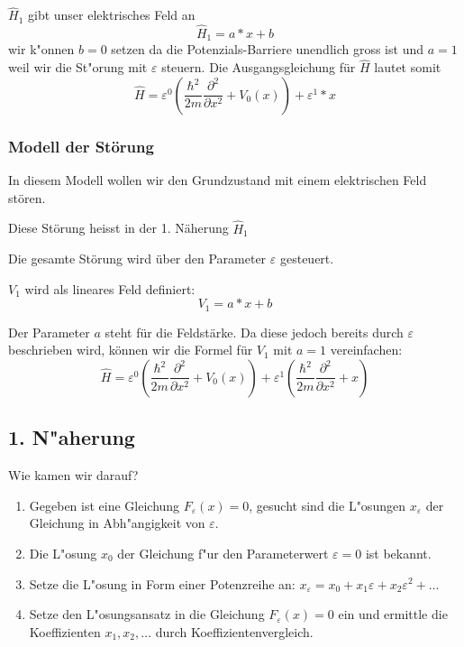 \begin{refsection}
$\hat H_1$ gibt unser elektrisches Feld an
\[
  \hat H_1 = a*x + b
\]
wir k"onnen $b = 0$ setzen da die Potenzials-Barriere unendlich gross ist und $a = 1$ weil wir die St"orung mit $\varepsilon$ steuern.
Die Ausgangsgleichung f\"ur $\hat{H}$ lautet somit
\[
  \hat{H} = \varepsilon^0 ( \frac{\hbar^2}{2m} \frac{\partial^2}{\partial x^2} + V_0(x) )
            + \varepsilon^1*x
\]

\subsubsection{ Modell der St\"orung }
In diesem Modell wollen wir den Grundzustand mit einem elektrischen Feld st\"oren.

Diese St\"orung heisst in der 1. N\"aherung $\hat H_1$

Die gesamte St\"orung wird \"uber den Parameter $\varepsilon$ gesteuert.

$V_1$ wird als lineares Feld definiert:
\[
  V_1 = a*x + b
\]

Der Parameter $a$ steht f\"ur die Feldst\"arke. Da diese jedoch bereits durch 
$\varepsilon$ beschrieben wird, k\"onnen wir die Formel f\"ur $V_1$ mit $a = 1$ vereinfachen:
\[
  \hat{H} = \varepsilon^0 ( \frac{\hbar^2}{2m} \frac{\partial^2}{\partial x^2} + V_0(x) )
            + \varepsilon^1 ( \frac{\hbar^2}{2m} \frac{\partial^2}{\partial x^2} + x )
\]


\subsection{ 1. N"aherung }

Wie kamen wir darauf?

\begin{enumerate}
\item Gegeben ist eine Gleichung $F_\varepsilon(x)=0$, gesucht
sind die L"osungen $x_\varepsilon$ der Gleichung in Abh"angigkeit von
$\varepsilon$.
\item Die L"osung $x_0$ der Gleichung f"ur den Parameterwert $\varepsilon=0$
ist bekannt.
\item Setze die L"osung in Form einer Potenzreihe an:
$x_\varepsilon = x_0+x_1\varepsilon+x_2\varepsilon^2+\dots$
\item Setze den L"osungsansatz in die Gleichung $F_\varepsilon(x)=0$ ein
und ermittle die Koeffizienten $x_1,x_2,\dots$ durch Koeffizientenvergleich.
\end{enumerate}


\end{refsection}

